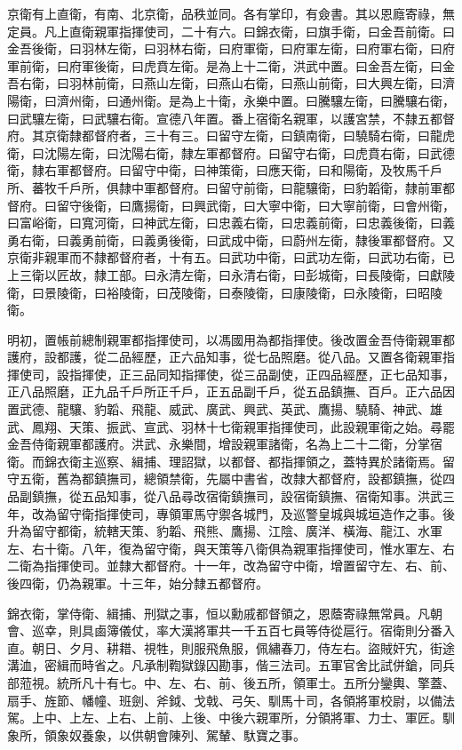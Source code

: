 京衛有上直衛，有南、北京衛，品秩並同。各有掌印，有僉書。其以恩廕寄祿，無定員。凡上直衛親軍指揮使司，二十有六。曰錦衣衛，曰旗手衛，曰金吾前衛。曰金吾後衛，曰羽林左衛，曰羽林右衛，曰府軍衛，曰府軍左衛，曰府軍右衛，曰府軍前衛，曰府軍後衛，曰虎賁左衛。是為上十二衛，洪武中置。曰金吾左衛，曰金吾右衛，曰羽林前衛，曰燕山左衛，曰燕山右衛，曰燕山前衛，曰大興左衛，曰濟陽衛，曰濟州衛，曰通州衛。是為上十衛，永樂中置。曰騰驤左衛，曰騰驤右衛，曰武驤左衛，曰武驤右衛。宣德八年置。番上宿衛名親軍，以護宮禁，不隸五都督府。其京衛隸都督府者，三十有三。曰留守左衛，曰鎮南衛，曰驍騎右衛，曰龍虎衛，曰沈陽左衛，曰沈陽右衛，隸左軍都督府。曰留守右衛，曰虎賁右衛，曰武德衛，隸右軍都督府。曰留守中衛，曰神策衛，曰應天衛，曰和陽衛，及牧馬千戶所、蕃牧千戶所，俱隸中軍都督府。曰留守前衛，曰龍驤衛，曰豹韜衛，隸前軍都督府。曰留守後衛，曰鷹揚衛，曰興武衛，曰大寧中衛，曰大寧前衛，曰會州衛，曰富峪衛，曰寬河衛，曰神武左衛，曰忠義右衛，曰忠義前衛，曰忠義後衛，曰義勇右衛，曰義勇前衛，曰義勇後衛，曰武成中衛，曰蔚州左衛，隸後軍都督府。又京衛非親軍而不隸都督府者，十有五。曰武功中衛，曰武功左衛，曰武功右衛，已上三衛以匠故，隸工部。曰永清左衛，曰永清右衛，曰彭城衛，曰長陵衛，曰獻陵衛，曰景陵衛，曰裕陵衛，曰茂陵衛，曰泰陵衛，曰康陵衛，曰永陵衛，曰昭陵衛。

明初，置帳前總制親軍都指揮使司，以馮國用為都指揮使。後改置金吾侍衛親軍都護府，設都護，從二品經歷，正六品知事，從七品照磨。從八品。又置各衛親軍指揮使司，設指揮使，正三品同知指揮使，從三品副使，正四品經歷，正七品知事，正八品照磨，正九品千戶所正千戶，正五品副千戶，從五品鎮撫、百戶。正六品因置武德、龍驤、豹韜、飛龍、威武、廣武、興武、英武、鷹揚、驍騎、神武、雄武、鳳翔、天策、振武、宣武、羽林十七衛親軍指揮使司，此設親軍衛之始。尋罷金吾侍衛親軍都護府。洪武、永樂間，增設親軍諸衛，名為上二十二衛，分掌宿衛。而錦衣衛主巡察、緝捕、理詔獄，以都督、都指揮領之，蓋特異於諸衛焉。留守五衛，舊為都鎮撫司，總領禁衛，先屬中書省，改隸大都督府，設都鎮撫，從四品副鎮撫，從五品知事，從八品尋改宿衛鎮撫司，設宿衛鎮撫、宿衛知事。洪武三年，改為留守衛指揮使司，專領軍馬守禦各城門，及巡警皇城與城垣造作之事。後升為留守都衛，統轄天策、豹韜、飛熊、鷹揚、江陰、廣洋、橫海、龍江、水軍左、右十衛。八年，復為留守衛，與天策等八衛俱為親軍指揮使司，惟水軍左、右二衛為指揮使司。並隸大都督府。十一年，改為留守中衛，增置留守左、右、前、後四衛，仍為親軍。十三年，始分隸五都督府。

錦衣衛，掌侍衛、緝捕、刑獄之事，恒以勳戚都督領之，恩蔭寄祿無常員。凡朝會、巡幸，則具鹵簿儀仗，率大漢將軍共一千五百七員等侍從扈行。宿衛則分番入直。朝日、夕月、耕耤、視牲，則服飛魚服，佩繡春刀，侍左右。盜賊奸宄，街途溝洫，密緝而時省之。凡承制鞫獄錄囚勘事，偕三法司。五軍官舍比試併鎗，同兵部蒞視。統所凡十有七。中、左、右、前、後五所，領軍士。五所分鑾輿、擎蓋、扇手、旌節、幡幢、班劍、斧鉞、戈戟、弓矢、馴馬十司，各領將軍校尉，以備法駕。上中、上左、上右、上前、上後、中後六親軍所，分領將軍、力士、軍匠。馴象所，領象奴養象，以供朝會陳列、駕輦、馱寶之事。

